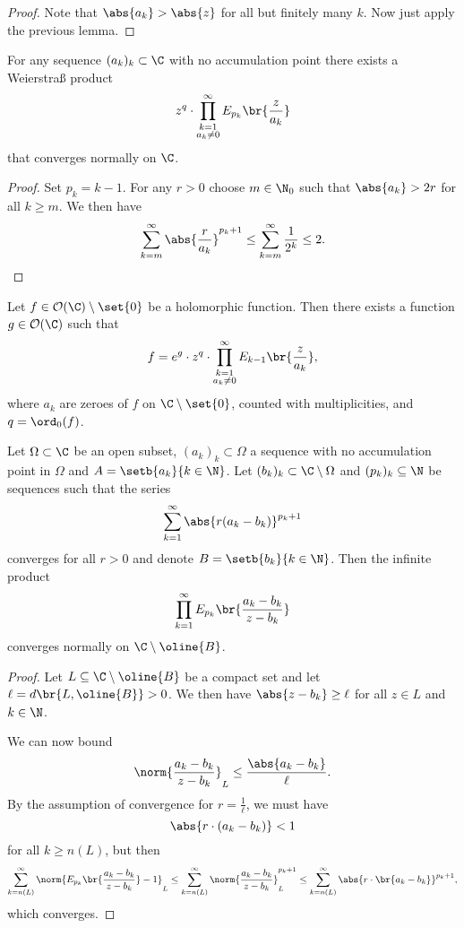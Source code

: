 \begin{proof}
Note that $\abs{a_k} > \abs{z}$ for all but finitely many $k$. Now
just apply the previous lemma.
\end{proof}

\begin{izrek}
For any sequence $(a_k)_k \subset \C$ with no accumulation point
there exists a Weierstraß product
\[
z^q \cdot \prod_{\substack{k=1 \\ a_k \ne 0}}^\infty
E_{p_k} \br{\frac{z}{a_k}}
\]
that converges normally on $\C$.
\end{izrek}

\begin{proof}
Set $p_k = k-1$. For any $r > 0$ choose $m \in \N_0$ such that
$\abs{a_k} > 2r$ for all $k \geq m$. We then have
\[
\sum_{k=m}^\infty \abs{\frac{r}{a_k}}^{p_k+1} \leq
\sum_{k=m}^\infty \frac{1}{2^k} \leq
2. \qedhere
\]
\end{proof}

\begin{izrek}
\label{inf_prod:thm:w_prod_1}
Let $f \in \mathcal{O}(\C) \setminus \set{0}$ be a holomorphic
function. Then there exists a function $g \in \mathcal{O}(\C)$ such
that
\[
f = e^g \cdot z^q \cdot \prod_{\substack{k=1 \\ a_k \ne 0}}^\infty
E_{k-1} \br{\frac{z}{a_k}},
\]
where $a_k$ are zeroes of $f$ on $\C \setminus \set{0}$, counted
with multiplicities, and $q = \ord_0(f)$.
\end{izrek}

\obvs

\begin{lema}
\label{inf_prod:lm:w_prod_omega}
Let $\Omega \subset \C$ be an open subset, $(a_k)_k \subset \Omega$
a sequence with no accumulation point in $\Omega$ and
$A = \setb{a_k}{k \in \N}$. Let
$(b_k)_k \subset \C \setminus \Omega$ and $(p_k)_k \subseteq \N$ be
sequences such that the series
\[
\sum_{k=1}^\infty \abs{r (a_k - b_k)}^{p_k+1}
\]
converges for all $r > 0$ and denote $B = \setb{b_k}{k \in \N}$.
Then the infinite product
\[
\prod_{k=1}^\infty E_{p_k} \br{\frac{a_k - b_k}{z - b_k}}
\]
converges normally on $\C \setminus \oline{B}$.
\end{lema}

\begin{proof}
Let $L \subseteq \C \setminus \oline{B}$ be a compact set and let
$\ell = d\br{L, \oline{B}} > 0$. We then have
$\abs{z - b_k} \geq \ell$ for all $z \in L$ and $k \in \N$.

We can now bound
\[
\norm{\frac{a_k - b_k}{z - b_k}}_L \leq
\frac{\abs{a_k - b_k}}{\ell}.
\]
By the assumption of convergence for $r = \frac{1}{\ell}$, we must
have
\[
\abs{r \cdot (a_k - b_k)} < 1
\]
for all $k \geq n(L)$, but then
\[
\sum_{k=n(L)}^\infty
\norm{E_{p_k} \br{\frac{a_k - b_k}{z - b_k}} - 1}_L \leq
\sum_{k=n(L)}^\infty 
\norm{\frac{a_k - b_k}{z - b_k}}_L^{p_k+1}\leq
\sum_{k=n(L)}^\infty \abs{r \cdot \br{a_k - b_k}}^{p_k+1},
\]
which converges.
\end{proof}

